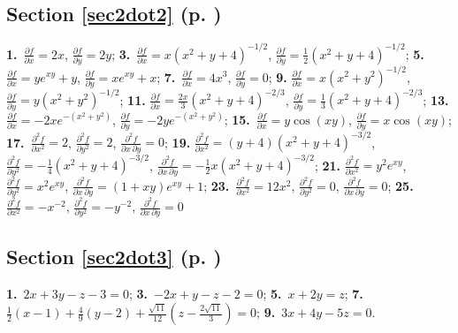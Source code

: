\begin{multicols}{2}
\subsection*{Section \ref{sec2dot2} (p. \pageref{sec2dot2})}
\textbf{1.}~$\frac{\partial f}{\partial x} = 2x$, $\frac{\partial f}{\partial y} = 2y$;\quad
\textbf{3.}~$\frac{\partial f}{\partial x} = x(x^2 + y + 4)^{-1/2}$,
$\frac{\partial f}{\partial y} = \frac{1}{2}(x^2 + y + 4)^{-1/2}$;\quad
\textbf{5.}~$\frac{\partial f}{\partial x} = ye^{xy} + y$, $\frac{\partial f}{\partial y} = xe^{xy} + x$;\quad
\textbf{7.}~$\frac{\partial f}{\partial x} = 4x^3$, $\frac{\partial f}{\partial y} = 0$; \quad
\textbf{9.}
$\frac{\partial f}{\partial x}=x(x^2 + y^2 )^{-1/2}$, $\frac{\partial f}{\partial y}=y(x^2 + y^2 )^{-1/2}$; \quad\textbf{11.}
$\frac{\partial f}{\partial x} = \frac{2x}{3}(x^2 + y + 4)^{-2/3}$,
$\frac{\partial f}{\partial y} = \frac{1}{3}(x^2 + y + 4)^{-2/3}$;\quad
\textbf{13.}
$\frac{\partial f}{\partial x}=-2xe^{-(x^2 + y^2 )}$, $\frac{\partial f}{\partial y}=-2ye^{-(x^2 + y^2 )}$;\quad
\textbf{15.}~$\frac{\partial f}{\partial x} = y\cos(xy)$, $\frac{\partial f}{\partial y} = x\cos(xy)$;\quad
\textbf{17.}~$\frac{\partial^2 f}{\partial x^2} =2$,
$\frac{\partial^2 f}{\partial y^2} = 2$,
$\frac{\partial^2 f}{\partial x \,\partial y} = 0$;\quad
\textbf{19.}
$\frac{\partial^2 f}{\partial x^2} = (y+4)(x^2 + y+4)^{-3/2}$, 
$\frac{\partial^2 f}{\partial y^2} = -\frac{1}{4}(x^2 + y+4)^{-3/2}$, 
$\frac{\partial^2 f}{\partial x \,\partial y} = -\frac{1}{2}x(x^2 + y+4)^{-3/2}$; \quad\textbf{21.}
$\frac{\partial^2 f}{\partial x^2} = y^2 e^{xy}$,
$\frac{\partial^2 f}{\partial y^2} = x^2 e^{xy}$,
$\frac{\partial^2 f}{\partial x \,\partial y} = (1+xy)e^{xy} + 1$;\quad
\textbf{23.}~$\frac{\partial^2 f}{\partial x^2} =12x^2$,
$\frac{\partial^2 f}{\partial y^2} = 0$,
$\frac{\partial^2 f}{\partial x \,\partial y} = 0$;\quad
\textbf{25.}~$\frac{\partial^2 f}{\partial x^2} =-x^{-2}$,
$\frac{\partial^2 f}{\partial y^2} = -y^{-2}$,
$\frac{\partial^2 f}{\partial x \,\partial y} = 0$

\subsection*{Section \ref{sec2dot3} (p. \pageref{sec2dot3})}

\textbf{1.}~$2x+3y-z-3=0$;\quad
\textbf{3.}~$-2x+y-z-2=0$;\quad
\textbf{5.}~$x+2y=z$;\quad
\textbf{7.}~$\frac{1}{2}(x-1)+\frac{4}{9}(y-2)+\frac{\sqrt{11}}{12}(z-\frac{2\sqrt{11}}{3})=0$;\quad
\textbf{9.}~$3x+4y-5z=0$.


\end{multicols}

